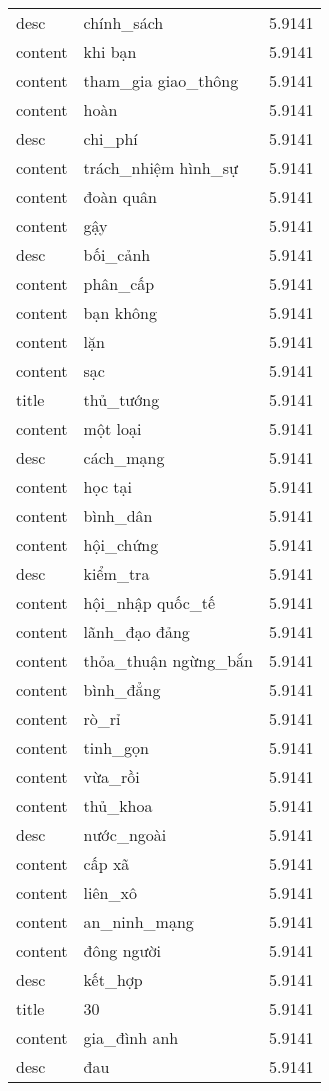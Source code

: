 \documentclass{article}
\begin{document}
\begin{tabular}{lll}
desc & chính\_sách & 5.9141\\
content & khi bạn & 5.9141\\
content & tham\_gia giao\_thông & 5.9141\\
content & hoàn & 5.9141\\
desc & chi\_phí & 5.9141\\
content & trách\_nhiệm hình\_sự & 5.9141\\
content & đoàn quân & 5.9141\\
content & gậy & 5.9141\\
desc & bối\_cảnh & 5.9141\\
content & phân\_cấp & 5.9141\\
content & bạn không & 5.9141\\
content & lặn & 5.9141\\
content & sạc & 5.9141\\
title & thủ\_tướng & 5.9141\\
content & một loại & 5.9141\\
desc & cách\_mạng & 5.9141\\
content & học tại & 5.9141\\
content & bình\_dân & 5.9141\\
content & hội\_chứng & 5.9141\\
desc & kiểm\_tra & 5.9141\\
content & hội\_nhập quốc\_tế & 5.9141\\
content & lãnh\_đạo đảng & 5.9141\\
content & thỏa\_thuận ngừng\_bắn & 5.9141\\
content & bình\_đẳng & 5.9141\\
content & rò\_rỉ & 5.9141\\
content & tinh\_gọn & 5.9141\\
content & vừa\_rồi & 5.9141\\
content & thủ\_khoa & 5.9141\\
desc & nước\_ngoài & 5.9141\\
content & cấp xã & 5.9141\\
content & liên\_xô & 5.9141\\
content & an\_ninh\_mạng & 5.9141\\
content & đông người & 5.9141\\
desc & kết\_hợp & 5.9141\\
title & 30 & 5.9141\\
content & gia\_đình anh & 5.9141\\
desc & đau & 5.9141\\

\end{tabular}
\end{document}
